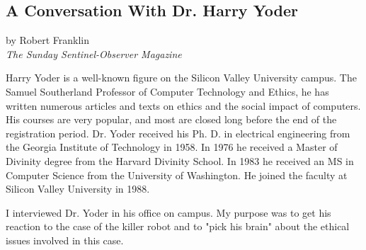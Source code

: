 \begin{center}
\section*{A Conversation With Dr. Harry Yoder}
by Robert Franklin\\
\textit{The Sunday Sentinel-Observer Magazine}
\end{center}

Harry Yoder is a well-known figure on the Silicon Valley University campus. The Samuel Southerland Professor of Computer Technology and Ethics, he has written numerous articles and texts on ethics and the social impact of computers. His courses are very popular, and most are closed long before the end of the registration period. Dr. Yoder received his Ph. D. in electrical engineering from the Georgia Institute of Technology in 1958. In 1976 he received a Master of Divinity degree from the Harvard Divinity School. In 1983 he received an MS in Computer Science from the University of Washington. He joined the faculty at Silicon Valley University in 1988.

I interviewed Dr. Yoder in his office on campus. My purpose was to get his reaction to the case of the killer robot and to "pick his brain" about the ethical issues involved in this case.
